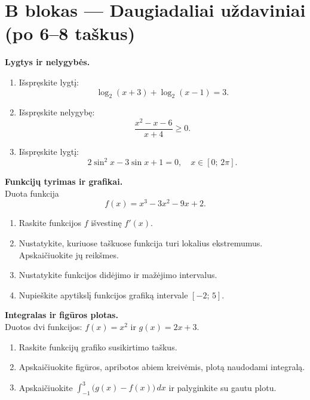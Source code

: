 \section*{B blokas — Daugiadaliai uždaviniai (po 6–8 taškus)}

\begin{exercise}
\textbf{Lygtys ir nelygybės.}
\begin{enumerate}[label=\arabic*.]
  \item Išspręskite lygtį:
  \[
    \log_2(x+3) + \log_2(x-1) = 3.
  \]
  \item Išspręskite nelygybę:
  \[
    \frac{x^2 - x - 6}{x + 4} \geq 0.
  \]
  \item Išspręskite lygtį:
  \[
    2\sin^2 x - 3\sin x + 1 = 0, \quad x \in [0;\, 2\pi].
  \]
\end{enumerate}
\end{exercise}

\begin{exercise}
\textbf{Funkcijų tyrimas ir grafikai.}\\
Duota funkcija
\[
  f(x) = x^3 - 3x^2 - 9x + 2.
\]
\begin{enumerate}[label=\arabic*.]
  \item Raskite funkcijos $f$ išvestinę $f'(x)$.
  \item Nustatykite, kuriuose taškuose funkcija turi lokalius ekstremumus.
        Apskaičiuokite jų reikšmes.
  \item Nustatykite funkcijos didėjimo ir mažėjimo intervalus.
  \item Nupieškite apytikslį funkcijos grafiką intervale $[-2;\, 5]$.
\end{enumerate}
\end{exercise}

\begin{exercise}
\textbf{Integralas ir figūros plotas.}\\
Duotos dvi funkcijos: $f(x) = x^2$ ir $g(x) = 2x + 3$.
\begin{enumerate}[label=\arabic*.]
  \item Raskite funkcijų grafiko susikirtimo taškus.
  \item Apskaičiuokite figūros, apribotos abiem kreivėmis, plotą naudodami
        integralą.
  \item Apskaičiuokite $\displaystyle\int_{-1}^{3} \bigl(g(x) - f(x)\bigr)\,dx$ ir
        palyginkite su gautu plotu.
\end{enumerate}
\end{exercise}

